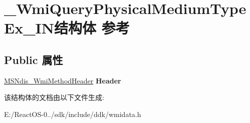 \hypertarget{struct___wmi_query_physical_medium_type_ex___i_n}{}\section{\+\_\+\+Wmi\+Query\+Physical\+Medium\+Type\+Ex\+\_\+\+I\+N结构体 参考}
\label{struct___wmi_query_physical_medium_type_ex___i_n}
\subsection*{Public 属性}
\begin{DoxyCompactItemize}
\item 
\mbox{\label{struct___wmi_query_physical_medium_type_ex___i_n_a5f75214834fa9c9faaaef603b664ac63}} 
\hyperlink{struct___m_s_ndis___wmi_method_header}{M\+S\+Ndis\+\_\+\+Wmi\+Method\+Header} {\bfseries Header}
\end{DoxyCompactItemize}


该结构体的文档由以下文件生成\+:\begin{DoxyCompactItemize}
\item 
E\+:/\+React\+O\+S-\/0../sdk/include/ddk/wmidata.\+h\end{DoxyCompactItemize}
